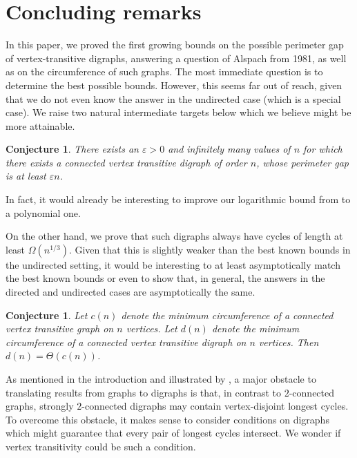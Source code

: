 \documentclass[english,11pt]{article}
\newtheorem{conj}[theorem]{Conjecture}
\theoremstyle{definition}
\numberwithin{equation}{section}
\numberwithin{figure}{section}
\newcommand{\eps}{\varepsilon}
\begin{document}
\section{Concluding remarks}\label{sec:conc-remarks}

In this paper, we proved the first growing bounds on the possible perimeter gap of vertex-transitive digraphs, answering a question of Alspach from 1981, as well as on the circumference of such graphs. The most immediate question is to determine the best possible bounds. However, this seems far out of reach, given that we do not even know the answer in the undirected case (which is a special case). We raise two natural intermediate targets below which we believe might be more attainable. 

\begin{conj}
    There exists an $\eps >0$ and infinitely many values of $n$ for which there exists a connected vertex transitive digraph of order $n$, whose perimeter gap is at least $\eps n$.
\end{conj}

In fact, it would already be interesting to improve our logarithmic bound from  to a polynomial one.

On the other hand, we prove that such digraphs always have cycles of length at least $\Omega(n^{1/3})$. Given that this is slightly weaker than the best known bounds in the undirected setting, it would be interesting to at least asymptotically match the best known bounds or even to show that, in general, the answers in the directed and undirected cases are asymptotically the same.

\begin{conj}
    Let $c(n)$ denote the minimum circumference of a connected vertex transitive graph on $n$ vertices. Let $d(n)$ denote the minimum circumference of a connected vertex transitive digraph on $n$ vertices. Then $d(n)= \Theta(c(n))$.
\end{conj}


As mentioned in the introduction and illustrated by , a major obstacle to translating results from graphs to digraphs is that, in contrast to $2$-connected graphs, strongly $2$-connected digraphs may contain vertex-disjoint longest cycles.
To overcome this obstacle, it makes sense to consider conditions on digraphs which might guarantee that every pair of longest cycles intersect.
We wonder if vertex transitivity could be such a condition.
\end{document}
